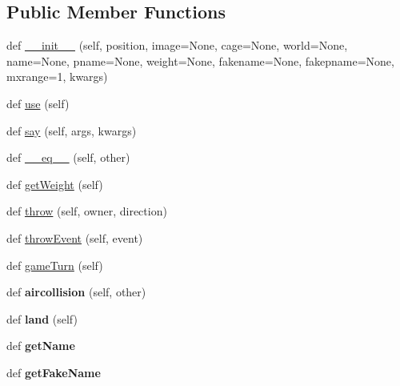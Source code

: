 \subsection*{Public Member Functions}
\begin{DoxyCompactItemize}
\item 
def \hyperlink{classitems_1_1_item_ac5bafbc6f3051ff7612ece057be6875b}{\+\_\+\+\_\+init\+\_\+\+\_\+} (self, position, image=None, cage=None, world=None, name=None, pname=None, weight=None, fakename=None, fakepname=None, mxrange=1, kwargs)
\item 
def \hyperlink{classitems_1_1_item_adef3ba0298ba7345eadea2bb776edfe9}{use} (self)
\item 
def \hyperlink{classitems_1_1_item_a22551198601165cd6b712b0011d323e4}{say} (self, args, kwargs)
\item 
def \hyperlink{classitems_1_1_item_a401a88231e01b131d27c410996734f6c}{\+\_\+\+\_\+eq\+\_\+\+\_\+} (self, other)
\item 
def \hyperlink{classitems_1_1_item_a7e80e9908e2a7cfff8e8f1bb8ca060a2}{get\+Weight} (self)
\item 
def \hyperlink{classitems_1_1_item_aa729c1ff69df390a0564b06e498ca213}{throw} (self, owner, direction)
\item 
def \hyperlink{classitems_1_1_item_adaea6b467affcc07d421008bf42330a0}{throw\+Event} (self, event)
\item 
def \hyperlink{classitems_1_1_item_aa25d9560ac3b920b5eb77dd4a62b3cc1}{game\+Turn} (self)
\item 
\hypertarget{classitems_1_1_item_ab0fd260891814b0dfce25a1566293ae9}{}def {\bfseries aircollision} (self, other)\label{classitems_1_1_item_ab0fd260891814b0dfce25a1566293ae9}

\item 
\hypertarget{classitems_1_1_item_a089c5885940a292402fcb43d78c1a1bd}{}def {\bfseries land} (self)\label{classitems_1_1_item_a089c5885940a292402fcb43d78c1a1bd}

\item 
\hypertarget{classitems_1_1_item_a0abb842ca58746538168ce81a96e2afd}{}def {\bfseries get\+Name}\label{classitems_1_1_item_a0abb842ca58746538168ce81a96e2afd}

\item 
\hypertarget{classitems_1_1_item_a5c14098ca0321c58db0b3184d16ca22a}{}def {\bfseries get\+Fake\+Name}\label{classitems_1_1_item_a5c14098ca0321c58db0b3184d16ca22a}

\end{DoxyCompactItemize}
